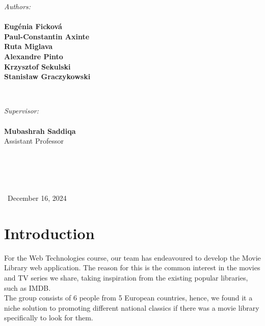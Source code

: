 \documentclass[letterpaper,twocolumn]{article}
\begin{document}
\begin{titlepage}
\begin{minipage}{0.4\textwidth}
\begin{flushleft} \large
\emph{Authors:}
\\\textbf{}
\\\textbf{Eugénia Ficková}
\\\textbf{Paul-Constantin Axinte}
\\\textbf{Ruta Miglava}
\\\textbf{Alexandre Pinto}
\\\textbf{Krzysztof Sekulski}
\\\textbf{Stanisław Graczykowski}


\end{flushleft}
\end{minipage}
~
\begin{minipage}{0.4\textwidth}
\begin{flushright} \large
\emph{Supervisor:} 
\\\textbf{}
\\\textbf{Mubashrah Saddiqa}
\\Assistant Professor
\\\textbf{}
\\\textbf{}
\\\textbf{}
\\\textbf{}


\end{flushright}
\end{minipage}\\[3cm]




\centering
\large \ December 16, 2024


\vfill %

\end{titlepage}



\section{Introduction}

For the Web Technologies course, our team has endeavoured to develop the Movie Library web application. The reason for this is the common interest in the movies and TV series we share, taking inspiration from the existing popular libraries, such as IMDB. \\

The group consists of 6 people from 5 European countries, hence, we found it a niche solution to promoting different national classics if there was a movie library specifically to look for them. \\ 
\end{document}

